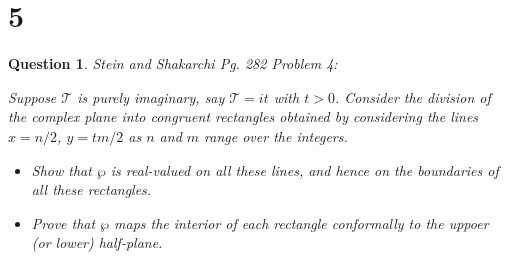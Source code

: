 \documentclass{article}
\newtheorem{question}{Question}
\begin{document}
\break

\section*{5}
\begin{myBox}[]{}
    \begin{question}
        Stein and Shakarchi Pg. 282 Problem 4:

        Suppose $\mathcal{T}$ is purely imaginary, say $\mathcal{T}=it$ with $t>0$. 
        Consider the division of the complex plane into congruent rectangles obtained by considering the lines $x=n/2$, $y=tm/2$ as $n$ and $m$ range over the integers.
        \begin{itemize}
            \item[(a)] Show that $\wp$ is real-valued on all these lines, and hence on the boundaries of all these rectangles.
            \item[(b)] Prove that $\wp$ maps the interior of each rectangle conformally to the uppoer (or lower) half-plane. 
        \end{itemize}
    \end{question}
\end{myBox}
\end{document}
